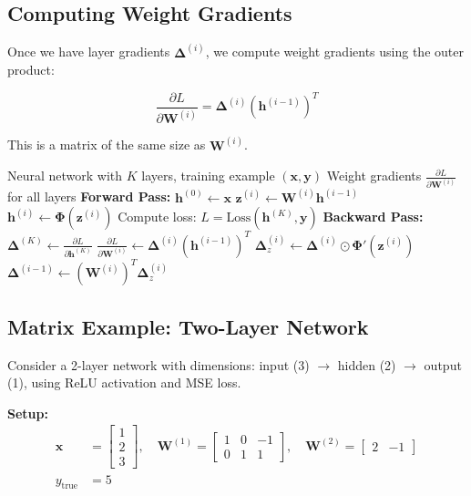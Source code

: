 \begin{notechapter}
\subsection{Computing Weight Gradients}

Once we have layer gradients $\boldsymbol{\Delta}^{(i)}$, we compute weight gradients using the outer product:

$$\frac{\partial L}{\partial \mathbf{W}^{(i)}} = \boldsymbol{\Delta}^{(i)} (\mathbf{h}^{(i-1)})^T$$

This is a matrix of the same size as $\mathbf{W}^{(i)}$.

\begin{algorithm}[H]
\caption{Vector-Centric Backpropagation}
\begin{algorithmic}[1]
\Require Neural network with $K$ layers, training example $(\mathbf{x}, \mathbf{y})$
\Ensure Weight gradients $\frac{\partial L}{\partial \mathbf{W}^{(i)}}$ for all layers
\State \textbf{Forward Pass:}
\State $\mathbf{h}^{(0)} \gets \mathbf{x}$
    \State $\mathbf{z}^{(i)} \gets \mathbf{W}^{(i)} \mathbf{h}^{(i-1)}$
    \State $\mathbf{h}^{(i)} \gets \boldsymbol{\Phi}(\mathbf{z}^{(i)})$
\EndFor
\State Compute loss: $L = \text{Loss}(\mathbf{h}^{(K)}, \mathbf{y})$
\State \textbf{Backward Pass:}
\State $\boldsymbol{\Delta}^{(K)} \gets \frac{\partial L}{\partial \mathbf{h}^{(K)}}$
    \State $\frac{\partial L}{\partial \mathbf{W}^{(i)}} \gets \boldsymbol{\Delta}^{(i)} (\mathbf{h}^{(i-1)})^T$ 
    \State $\boldsymbol{\Delta}_z^{(i)} \gets \boldsymbol{\Delta}^{(i)} \odot \boldsymbol{\Phi}'(\mathbf{z}^{(i)})$ 
    \State $\boldsymbol{\Delta}^{(i-1)} \gets (\mathbf{W}^{(i)})^T \boldsymbol{\Delta}_z^{(i)}$ 
\EndFor
\end{algorithmic}
\end{algorithm}

\subsection{Matrix Example: Two-Layer Network}

\begin{example}
Consider a 2-layer network with dimensions: input (3) $\to$ hidden (2) $\to$ output (1), using ReLU activation and MSE loss.
\end{example}

\textbf{Setup:}
\begin{align*}
\mathbf{x} &= \begin{bmatrix} 1 \\ 2 \\ 3 \end{bmatrix}, \quad
\mathbf{W}^{(1)} = \begin{bmatrix} 1 & 0 & -1 \\ 0 & 1 & 1 \end{bmatrix}, \quad
\mathbf{W}^{(2)} = \begin{bmatrix} 2 & -1 \end{bmatrix}\\[0.5em]
y_{\text{true}} &= 5
\end{align*}


\end{notechapter}
